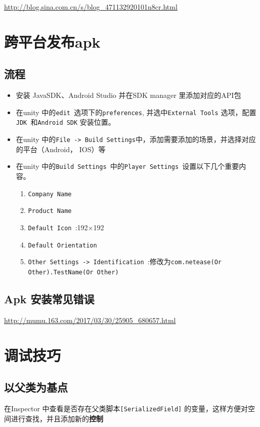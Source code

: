 \documentclass[UTF8,a4paper,12pt]{ctexbook}
\begin{document}
		\url{http://blog.sina.com.cn/s/blog_471132920101n8cr.html}
		
\chapter{跨平台发布apk}
	\section{流程}
		\begin{itemize}
			\item 安装 JavaSDK、Android Studio 并在SDK manager 里添加对应的API包
			\item 在unity 中的\verb|edit |选项下的\verb|preferences|, 并选中\verb|External Tools| 选项，配置\verb|JDK |和\verb|Android SDK| 安装位置。
			\item 在unity 中的\verb|File -> Build Settings|中，添加需要添加的场景，并选择对应的平台（Android， IOS）等
			\item 在unity 中的\verb|Build Settings |中的\verb|Player Settings |设置以下几个重要内容。
				\begin{enumerate}
					\item \verb|Company Name |
					\item \verb|Product Name |
					\item \verb|Default Icon |:192$\times$192
					\item \verb|Default Orientation |
					\item \verb|Other Settings -> Identification |:修改为\verb|com.netease(Or Other).TestName(Or Other)|
				\end{enumerate}
		\end{itemize}	
	
	\section{Apk 安装常见错误}
		\url{http://mumu.163.com/2017/03/30/25905_680657.html}


\chapter{调试技巧}
	\section{以父类为基点}
		在Inspector 中查看是否存在父类脚本\verb|[SerializedField]| 的变量，这样方便对空间进行查找，并且添加新的\textbf{控制}			
	
	
	
\end{document}
